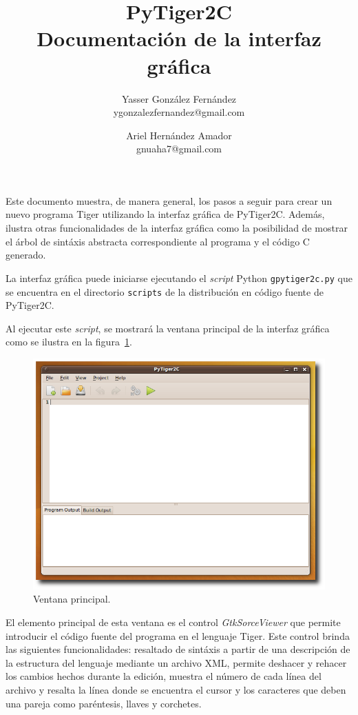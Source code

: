 \documentclass{article}
\title{
    \LARGE{PyTiger2C} \\
    \Large{Documentación de la interfaz gráfica}
}
\author{
    Yasser González Fernández \\
    \small{ygonzalezfernandez@gmail.com}
    \and
    Ariel Hernández Amador \\
    \small{gnuaha7@gmail.com}
}
\date{}
\begin{document}
\maketitle

\thispagestyle{empty}

\newpage

\setcounter{page}{1}

Este documento muestra, de manera general, los pasos a seguir para crear un
nuevo programa Tiger utilizando la interfaz gráfica de PyTiger2C. Además,
ilustra otras funcionalidades de la interfaz gráfica como la posibilidad de
mostrar el árbol de sintáxis abstracta correspondiente al programa y
el código C generado.

La interfaz gráfica puede iniciarse ejecutando el \emph{script} Python
\texttt{gpytiger2c.py} que se encuentra en el directorio \texttt{scripts}
de la distribución en código fuente de PyTiger2C.

Al ejecutar este \emph{script}, se mostrará la ventana principal de la interfaz
gráfica como se ilustra en la figura~\ref{fig:1-main-window}.

\begin{figure}[htb]
  \centering
  \includegraphics[width=5.5in]{gui/1-main-window}
  \caption{Ventana principal.}
  \label{fig:1-main-window}
\end{figure}

El elemento principal de esta ventana es el control \emph{GtkSorceViewer} que
permite introducir el código fuente del programa en el lenguaje Tiger. Este
control brinda las siguientes funcionalidades: resaltado de sintáxis a partir
de una descripción de la estructura del lenguaje mediante un archivo XML,
permite deshacer y rehacer los cambios hechos durante la edición, muestra el
número de cada línea del archivo y resalta la línea donde se encuentra el cursor
y los caracteres que deben una pareja como paréntesis, llaves y corchetes.
\end{document}
